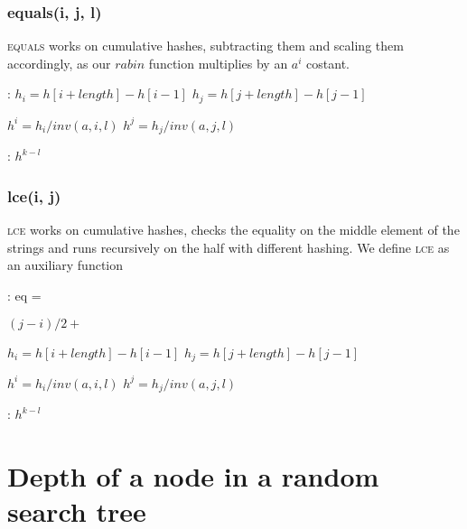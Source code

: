 \documentclass{article}
\begin{document}
\subsubsection{equals(i, j, l)}

\textsc{equals} works on cumulative hashes, subtracting them and scaling them
accordingly, as our $rabin$ function multiplies by an $a^{i}$ costant.

\begin{algorithmic}[1]
  :
    \State $h_i = h[i + length] - h[i - 1]$\;
    \State $h_j = h[j + length] - h[j - 1]$\;

    \State $h^{i} = h_i / inv(a, i, l)$\;
    \State $h^{j} = h_j / inv(a, j, l)$\;

    \;
    \EndFunction

    :
    \Return $h^{k - l}$
    \EndFunction
\end{algorithmic}

\subsubsection{lce(i, j)}

\textsc{lce} works on cumulative hashes, checks the equality on the middle element
of the strings and runs recursively on the half with different hashing.
We define \textsc{lce} as an auxiliary function

\begin{algorithmic}[1]
  :
    \State eq = \;

        \Else $(j - i) / 2 + $      %
    \EndIf

    \State $h_i = h[i + length] - h[i - 1]$\;
    \State $h_j = h[j + length] - h[j - 1]$\;

    \State $h^{i} = h_i / inv(a, i, l)$\;
    \State $h^{j} = h_j / inv(a, j, l)$\;

    \;
    \EndFunction

    :
    \Return $h^{k - l}$
    \EndFunction
\end{algorithmic}

\newpage
\section{Depth of a node in a random search tree}
\end{document}
